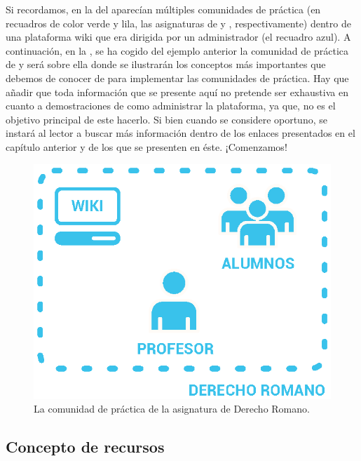 Si recordamos, en la  del  aparecían múltiples comunidades de práctica (en recuadros de color verde y lila, las asignaturas de  y , respectivamente) dentro de una plataforma wiki que era dirigida por un administrador (el recuadro azul). A continuación, en la , se ha cogido del ejemplo anterior la comunidad de práctica de  y será sobre ella donde se ilustrarán los conceptos más importantes que debemos de conocer de \tiki{} para implementar las comunidades de práctica. Hay que añadir que toda información que se presente aquí no pretende ser exhaustiva en cuanto a demostraciones de como administrar la plataforma, ya que, no es el objetivo principal de este \pfc{} hacerlo. Si bien cuando se considere oportuno, se instará al lector a buscar más información dentro de los enlaces presentados en el capítulo anterior y de los que se presenten en éste. ¡Comenzamos!

\begin{figure}
\centering
\includegraphics[width=.8\linewidth]{../graphics/fig_comunidad_de_practica_derecho_romano.eps}
\caption{La comunidad de práctica de la asignatura de Derecho Romano.}\label{fig:comunidad_de_practica_derecho_romano}
\end{figure}

\subsection{Concepto de recursos}
\label{section:concepto-recursos}

